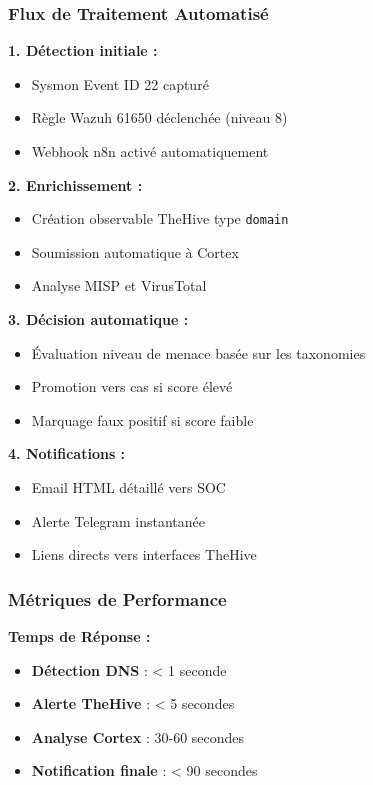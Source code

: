 \subsubsection{Flux de Traitement Automatisé}

\textbf{1. Détection initiale :}
\begin{itemize}
    \item Sysmon Event ID 22 capturé
    \item Règle Wazuh 61650 déclenchée (niveau 8)
    \item Webhook n8n activé automatiquement
\end{itemize}

\textbf{2. Enrichissement :}
\begin{itemize}
    \item Création observable TheHive type \texttt{domain}
    \item Soumission automatique à Cortex
    \item Analyse MISP et VirusTotal
\end{itemize}

\textbf{3. Décision automatique :}
\begin{itemize}
    \item Évaluation niveau de menace basée sur les taxonomies
    \item Promotion vers cas si score élevé
    \item Marquage faux positif si score faible
\end{itemize}

\textbf{4. Notifications :}
\begin{itemize}
    \item Email HTML détaillé vers SOC
    \item Alerte Telegram instantanée
    \item Liens directs vers interfaces TheHive
\end{itemize}

\subsubsection{Métriques de Performance}

\textbf{Temps de Réponse :}
\begin{itemize}
    \item \textbf{Détection DNS} : < 1 seconde
    \item \textbf{Alerte TheHive} : < 5 secondes
    \item \textbf{Analyse Cortex} : 30-60 secondes
    \item \textbf{Notification finale} : < 90 secondes
\end{itemize}

